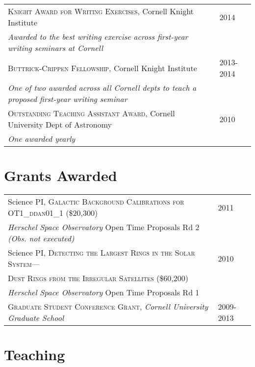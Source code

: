 \documentclass[10pt]{article} %
\begin{document}
\begin{tabular}{l>{\hfill}p{2.2cm}}
\textsc{Knight Award for Writing Exercises}, Cornell Knight Institute & 2014 \\
{\it Awarded to the best writing exercise across first-year writing seminars at Cornell} \\
\textsc{Buttrick-Crippen Fellowship}, Cornell Knight Institute & 2013-2014 \\
{\it One of two awarded across all Cornell depts to teach a proposed first-year writing seminar} \\
\textsc{Outstanding Teaching Assistant Award}, Cornell University Dept of Astronomy & 2010 \\
{\it One awarded yearly} \\
\end{tabular}



\section{Grants Awarded}

\begin{tabular}{l>{\hfill}p{2.4cm}}
Science PI, \textsc{Galactic Background Calibrations for OT1\_ddan01\_1} \footnotesize(\$20,300)\normalsize & 2011 \\
{\it Herschel Space Observatory} Open Time Proposals Rd 2 {\it (Obs. not executed)} \\
Science PI, \textsc{Detecting the Largest Rings in the Solar System---} & 2010 \\ 
\textsc{Dust Rings from the Irregular Satellites} \footnotesize(\$60,200)\normalsize \\
{\it Herschel Space Observatory} Open Time Proposals Rd 1 \\
\textsc{Graduate Student Conference Grant}, {\it Cornell University Graduate School} & 2009-2013\\
\end{tabular}


\section{Teaching}
\end{document}
